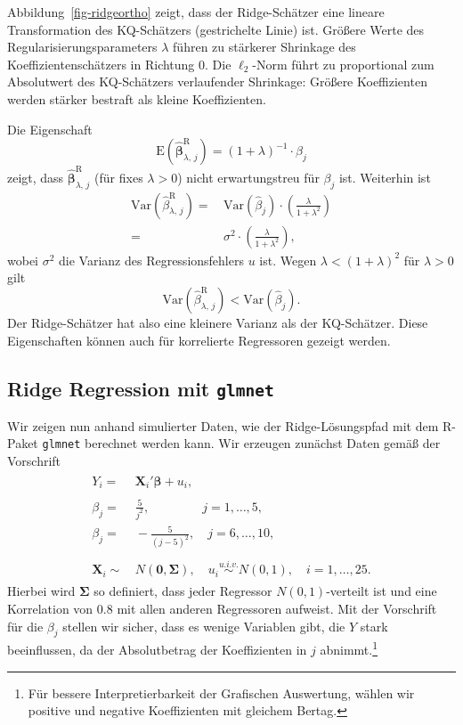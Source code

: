 \documentclass[
  a4paper,
  DIV=11,
  oneside]{scrreprt}
\begin{document}
Abbildung~\ref{fig-ridgeortho} zeigt, dass der Ridge-Schätzer eine
lineare Transformation des KQ-Schätzers (gestrichelte Linie) ist.
Größere Werte des Regularisierungsparameters \(\lambda\) führen zu
stärkerer Shrinkage des Koeffizientenschätzers in Richtung 0. Die
\(\ell_2\)-Norm führt zu proportional zum Absolutwert des KQ-Schätzers
verlaufender Shrinkage: Größere Koeffizienten werden stärker bestraft
als kleine Koeffizienten.

Die Eigenschaft
\[\mathrm{E}\left(\widehat{\boldsymbol{\beta}}^{\mathrm{R}}_{\lambda,\,j}\right) = (1+\lambda)^{-1} \cdot \beta_j\]
zeigt, dass \(\widehat{\boldsymbol{\beta}}^{\mathrm{R}}_{\lambda,\,j}\)
(für fixes \(\lambda>0\)) nicht erwartungstreu für \(\beta_j\) ist.
Weiterhin ist \begin{align*}
  \mathrm{Var}\left(\widehat{\beta}^{\mathrm{R}}_{\lambda,\,j}\right) =&\, 
  \mathrm{Var}\left(\widehat{\beta}_j\right) \cdot \left(\frac{\lambda}{1+\lambda^2}\right)\\
    =&\, \sigma^2\cdot \left(\frac{\lambda}{1+\lambda^2}\right),
\end{align*} wobei \(\sigma^2\) die Varianz des Regressionsfehlers \(u\)
ist. Wegen \(\lambda<(1+\lambda)^2\) für \(\lambda>0\) gilt
\[\mathrm{Var}\left(\widehat{\beta}^{\mathrm{R}}_{\lambda,\,j}\right)<\mathrm{Var}\left(\widehat{\beta}_j\right).\]
Der Ridge-Schätzer hat also eine kleinere Varianz als der KQ-Schätzer.
Diese Eigenschaften können auch für korrelierte Regressoren gezeigt
werden.

\subsection{\texorpdfstring{Ridge Regression mit
\texttt{glmnet}}{Ridge Regression mit glmnet}}\label{ridge-regression-mit-glmnet}

Wir zeigen nun anhand simulierter Daten, wie der Ridge-Lösungspfad mit
dem R-Paket \texttt{glmnet} berechnet werden kann. Wir erzeugen zunächst
Daten gemäß der Vorschrift \begin{align}
  \begin{split}
  Y_i =&\, \boldsymbol{X}_i' \boldsymbol{\beta} + u_i,\\
  \\
  \beta_j =&\,  \frac{5}{j^2}, \qquad\qquad\ j=1,\dots,5,\\ 
  \beta_j =&\, -\frac{5}{(j-5)^2}, \quad j=6,\dots,10,\\
  \\
  \boldsymbol{X}_i \sim&\, N(\boldsymbol{0}, \boldsymbol{\Sigma}), \quad u_i \overset{u.i.v.}{\sim} N(0, 1), \quad i = 1,\dots,25.
  \end{split} \label{eq:ridgedgp1}
\end{align} Hierbei wird \(\boldsymbol{\Sigma}\) so definiert, dass
jeder Regressor \(N(0,1)\)-verteilt ist und eine Korrelation von \(0.8\)
mit allen anderen Regressoren aufweist. Mit der Vorschrift für die
\(\beta_j\) stellen wir sicher, dass es wenige Variablen gibt, die \(Y\)
stark beeinflussen, da der Absolutbetrag der Koeffizienten in \(j\)
abnimmt.\footnote{Für bessere Interpretierbarkeit der Grafischen
  Auswertung, wählen wir positive und negative Koeffizienten mit
  gleichem Bertag.}
\end{document}
